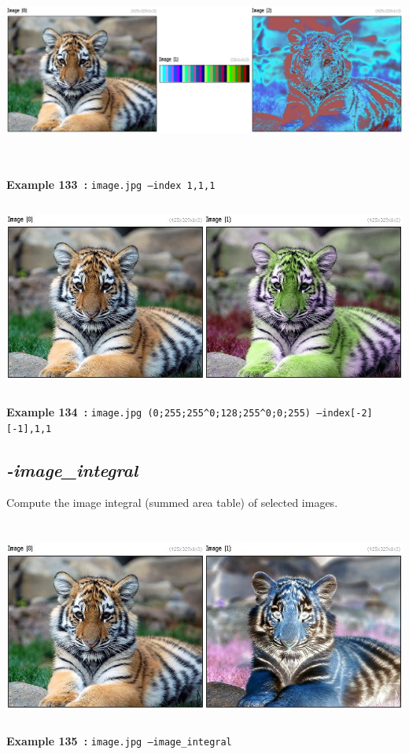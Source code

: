 \documentclass[a4paper,11pt,twoside]{book}
\begin{document}
\begin{center}\includegraphics[keepaspectratio=true,height=7cm,width=\textwidth]{img/gmic_def133.jpg}\\
{\footnotesize \textbf{Example 133~:} \texttt{image.jpg --index 1,1,1}}
\\\includegraphics[keepaspectratio=true,height=7cm,width=\textwidth]{img/gmic_def134.jpg}\\
{\footnotesize \textbf{Example 134~:} \texttt{image.jpg (0;255;255\textasciicircum 0;128;255\textasciicircum 0;0;255) --index[-2] [-1],1,1}}
\end{center}

\subsection{\emph{-image\_integral} }\vspace*{-0.5em}
Compute the image integral (summed area table) of selected images.
\begin{center}\includegraphics[keepaspectratio=true,height=7cm,width=\textwidth]{img/gmic_def135.jpg}\\
{\footnotesize \textbf{Example 135~:} \texttt{image.jpg --image\_integral}}
\end{center}
\end{document}
